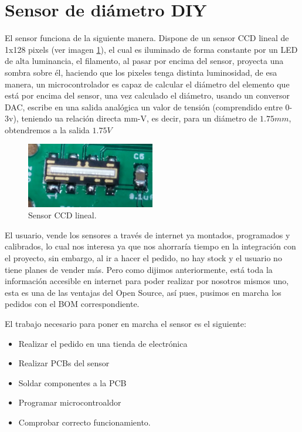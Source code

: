 \section{Sensor de diámetro DIY}
\label{sec:sensor}
El sensor funciona de la siguiente manera. Dispone de un sensor CCD lineal de 1x128 pixels (ver imagen \ref{fig:sens_CCD}), el cual es iluminado de forma constante por un LED de alta luminancia, el filamento, al pasar por encima del sensor, proyecta una sombra sobre él, haciendo que los pixeles tenga distinta luminosidad, de esa manera, un microcontrolador es capaz de calcular el diámetro del elemento que está por encima del sensor, una vez calculado el diámetro, usando un conversor DAC, escribe en una salida analógica un valor de tensión  (comprendido entre 0-3v), teniendo ua relación directa mm-V, es decir, para un diámetro de $1.75 mm$, obtendremos a la salida $1.75 V$\\
   \begin{figure}[H]
            \centering
            \includegraphics[width=0.5\textwidth]{images/sensor/IMG_20150414_135533_.jpg}
            \caption{Sensor CCD lineal.}
            \label{fig:sens_CCD}
    \end{figure}

El usuario, vende los sensores a través de internet ya montados, programados y calibrados, lo cual nos interesa ya que nos ahorraría tiempo en la integración con el proyecto, sin embargo, al ir a hacer el pedido, no hay stock y el usuario no tiene planes de vender más. Pero como dijimos anteriormente, está toda la información accesible en internet para poder realizar por nosotros mismos uno, esta es una de las ventajas del Open Source, así pues, pusimos en marcha los pedidos con el BOM correspondiente.

El trabajo necesario para poner en marcha el sensor es el siguiente:

\begin{itemize}
\item{Realizar el pedido en una tienda de electrónica}
\item{Realizar PCBs del sensor}
\item{Soldar componentes a la PCB}
\item{Programar microcontroaldor}
\item{Comprobar correcto funcionamiento.}
\end{itemize}

